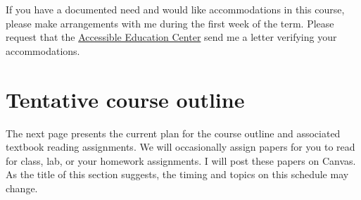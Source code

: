 \documentclass[10pt]{article}
\begin{document}
If you have a documented need and would like accommodations in this course, please make arrangements with me during the first week of the term. Please request that the \href{https://aec.uoregon.edu/}{Accessible Education Center} send me a letter verifying your accommodations.

\section*{Tentative course outline}

The next page presents the current plan for the course outline and associated textbook reading assignments. We will occasionally assign papers for you to read for class, lab, or your homework assignments. I will post these papers on Canvas. As the title of this section suggests, the timing and topics on this schedule may change.
\end{document}
